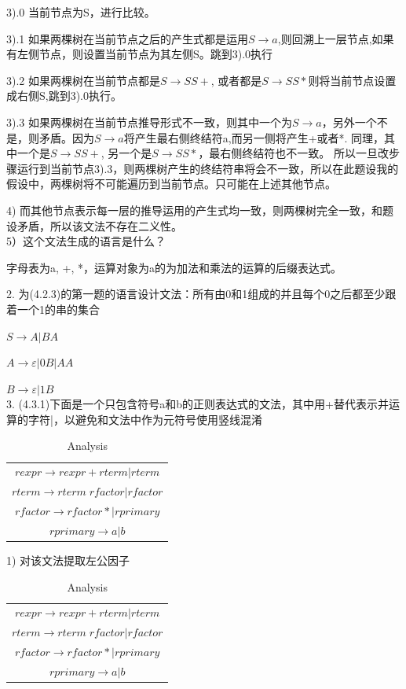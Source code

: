 \documentclass[a4paper, 16pt]{article}
\begin{document}
3).0 当前节点为S，进行比较。
	
		3).1 如果两棵树在当前节点之后的产生式都是运用$S \rightarrow a$,则回溯上一层节点,如果有左侧节点，则设置当前节点为其左侧S。跳到3).0执行
	
		3).2 如果两棵树在当前节点都是$S \rightarrow SS + $, 或者都是$ S\rightarrow S S *$则将当前节点设置成右侧S,跳到3).0执行。
	
		3).3 如果两棵树在当前节点推导形式不一致，则其中一个为$S \rightarrow a$，另外一个不是，则矛盾。因为$S \rightarrow a$将产生最右侧终结符a,而另一侧将产生+或者*. 同理，其中一个是$S \rightarrow SS + $, 另一个是$ S\rightarrow S S *$，最右侧终结符也不一致。 所以一旦改步骤运行到当前节点3).3，则两棵树产生的终结符串将会不一致，所以在此题设我的假设中，两棵树将不可能遍历到当前节点。只可能在上述其他节点。

4) 而其他节点表示每一层的推导运用的产生式均一致，则两棵树完全一致，和题设矛盾，所以该文法不存在二义性。\\

5）这个文法生成的语言是什么？

字母表为{a, +, *}，运算对象为{a}的为加法和乘法的运算的后缀表达式。

2. 为(4.2.3)的第一题的语言设计文法：所有由0和1组成的并且每个0之后都至少跟着一个1的串的集合

$S \rightarrow A|BA$

$A \rightarrow \varepsilon|0B|AA$

$B \rightarrow \varepsilon|1B$\\

3. (4.3.1)下面是一个只包含符号a和b的正则表达式的文法，其中用+替代表示并运算的字符|，以避免和文法中作为元符号使用竖线混淆\\
\begin{table}[H]
\centering
\caption{Analysis}
\begin{tabular}{c}
\hline
$rexpr \rightarrow rexpr + rterm| rterm$\\
$rterm \rightarrow rterm \;rfactor | rfactor$\\
$rfactor \rightarrow rfactor* | rprimary$\\
$rprimary \rightarrow a | b$\\
\hline
\end{tabular}
\end{table}

1) 对该文法提取左公因子
\begin{table}[H]
\centering
\caption{Analysis}
\begin{tabular}{c}
\hline
$rexpr \rightarrow rexpr + rterm| rterm$\\
$rterm \rightarrow rterm \;rfactor | rfactor$\\
$rfactor \rightarrow rfactor* | rprimary$\\
$rprimary \rightarrow a | b$\\
\hline
\end{tabular}
\end{table}
\end{document}
